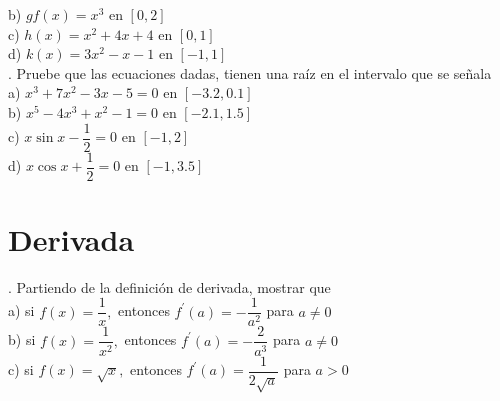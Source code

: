 \documentclass[letterpaper]{article}
\newcommand{\fp}[1]{#1^{\prime}}
\begin{document}

b) $gf(x) = x^{3} \text{  en  } [0,2] $\\


c) $ h(x) = x^{2}+4x+4 \text{  en  } [0,1] $\\


d) $ k(x) = 3x^{2} - x -1 \text{  en  } [-1,1] $\\


. Pruebe que las ecuaciones dadas, tienen una raíz en el intervalo que se señala\\

a) $ x^{3} + 7x^{2} -3x -5 = 0$ en $ [-3.2, 0.1] $\\


b) $ x^{5} - 4x^{3} +x^{2} -1 = 0$ en $ [-2.1, 1.5] $\\


c) $ x\sin x - \dfrac{1}{2} = 0$ en $ [-1, 2] $\\


d) $ x\cos x + \dfrac{1}{2} = 0$ en $ [-1,3.5] $\\


\section*{Derivada}

. Partiendo de la definición de derivada, mostrar que\\

a) si $ f(x) = \dfrac{1}{x}, $ entonces $ \fp{f}(a) = - \dfrac{1}{a^{2}}$ para $ a \neq 0 $\\


b) si $ f(x) = \dfrac{1}{x^2}, $ entonces $ \fp{f}(a) = - \dfrac{2}{a^{3}}$ para $ a \neq 0 $\\


c) si $ f(x) = \sqrt{x}, $ entonces $ \fp{f}(a) =  \dfrac{1}{2\sqrt{a}}$ para $ a > 0 $\\
\end{document}
